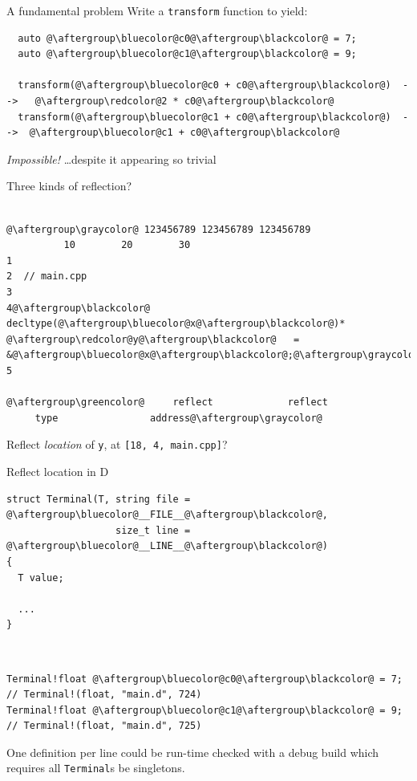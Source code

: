 \documentclass[xcolor=dvipsnames]{beamer}
\begin{document}
\begin{frame}[fragile]{A fundamental problem}
Write a \texttt{transform} function to yield:\vspace{10mm}
\begin{lstlisting}
  auto @\aftergroup\bluecolor@c0@\aftergroup\blackcolor@ = 7;
  auto @\aftergroup\bluecolor@c1@\aftergroup\blackcolor@ = 9;

  transform(@\aftergroup\bluecolor@c0 + c0@\aftergroup\blackcolor@)  -->   @\aftergroup\redcolor@2 * c0@\aftergroup\blackcolor@
  transform(@\aftergroup\bluecolor@c1 + c0@\aftergroup\blackcolor@)  -->  @\aftergroup\bluecolor@c1 + c0@\aftergroup\blackcolor@
\end{lstlisting}
\vspace{10mm}
\emph{Impossible!}
\ldots despite it appearing so trivial
\end{frame}


\begin{frame}[fragile]{Three kinds of reflection?}
  \begin{lstlisting}

@\aftergroup\graycolor@ 123456789 123456789 123456789
          10        20        30
1
2  // main.cpp
3
4@\aftergroup\blackcolor@  decltype(@\aftergroup\bluecolor@x@\aftergroup\blackcolor@)*   @\aftergroup\redcolor@y@\aftergroup\blackcolor@   =   &@\aftergroup\bluecolor@x@\aftergroup\blackcolor@;@\aftergroup\graycolor@
5

@\aftergroup\greencolor@     reflect             reflect
     type                address@\aftergroup\graycolor@
  \end{lstlisting}
 \vspace{10mm}
Reflect \emph{location} of {\color{red}\texttt{y}}, at {\color{red}\texttt{[18, 4, main.cpp]}}?
\end{frame}


\begin{frame}[fragile]{Reflect location in D}
\begin{lstlisting}
struct Terminal(T, string file = @\aftergroup\bluecolor@__FILE__@\aftergroup\blackcolor@,
                   size_t line = @\aftergroup\bluecolor@__LINE__@\aftergroup\blackcolor@)
{
  T value;

  ...
}
\end{lstlisting}

~

\begin{lstlisting}
Terminal!float @\aftergroup\bluecolor@c0@\aftergroup\blackcolor@ = 7; // Terminal!(float, "main.d", 724)
Terminal!float @\aftergroup\bluecolor@c1@\aftergroup\blackcolor@ = 9; // Terminal!(float, "main.d", 725)
\end{lstlisting}

\vspace{10mm}
{One definition per line could be run-time checked with a debug build which requires all \texttt{Terminal}s be singletons.}
\end{frame}


\begin{frame}[plain]
  \titlepage
\end{frame}
\end{document}
